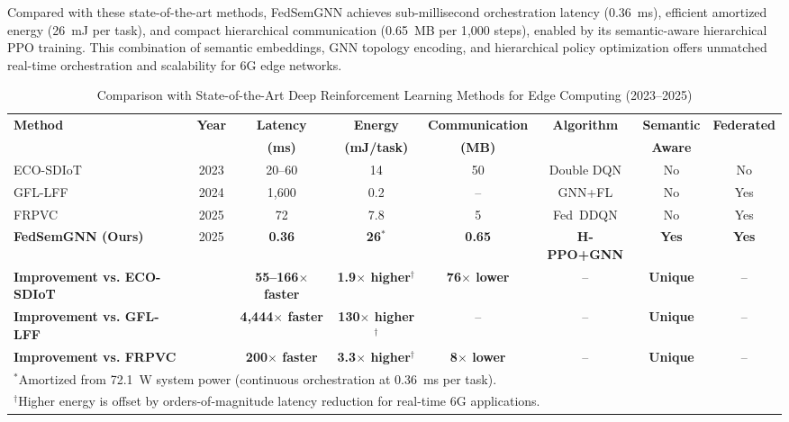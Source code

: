 \documentclass[conference]{IEEEtran}
\begin{document}
		Compared with these state-of-the-art methods, FedSemGNN achieves sub-millisecond orchestration latency (0.36~ms), efficient amortized energy (26~mJ per task), and compact hierarchical communication (0.65~MB per 1{,}000 steps), enabled by its semantic-aware hierarchical PPO training. 
		This combination of semantic embeddings, GNN topology encoding, and hierarchical policy optimization offers unmatched real-time orchestration and scalability for 6G edge networks.
		
		\begin{table}[htbp]
			\centering
			\caption{Comparison with State-of-the-Art Deep Reinforcement Learning Methods for Edge Computing (2023--2025)}
			\label{tab:sota_comparison}
			\small
			\begin{tabular}{lccccccc}
				\toprule
				\textbf{Method} & \textbf{Year} & \textbf{Latency} & \textbf{Energy} & \textbf{Communication} & \textbf{Algorithm} & \textbf{Semantic} & \textbf{Federated} \\
				& & \textbf{(ms)} & \textbf{(mJ/task)} & \textbf{(MB)} & & \textbf{Aware} & \\
				\midrule
				ECO-SDIoT~\cite{zhu2023eco} & 2023 & 20--60 & 14 & 50 & Double DQN & No & No \\
				GFL-LFF~\cite{regan2024gfl} & 2024 & 1{,}600 & 0.2 & -- & GNN+FL & No & Yes \\
				FRPVC~\cite{qian2025frpvc} & 2025 & 72 & 7.8 & 5 & Fed~DDQN & No & Yes \\
				\midrule
				\textbf{FedSemGNN (Ours)} & 2025 & \textbf{0.36} & \textbf{26}$^*$ & \textbf{0.65} & \textbf{H-PPO+GNN} & \textbf{Yes} & \textbf{Yes} \\
				\midrule
				\textbf{Improvement vs. ECO-SDIoT} & & \textbf{55--166$\times$ faster} & \textbf{1.9$\times$ higher}$^\dagger$ & \textbf{76$\times$ lower} & -- & \textbf{Unique} & -- \\
				\textbf{Improvement vs. GFL-LFF} & & \textbf{4{,}444$\times$ faster} & \textbf{130$\times$ higher}$^\dagger$ & -- & -- & \textbf{Unique} & -- \\
				\textbf{Improvement vs. FRPVC} & & \textbf{200$\times$ faster} & \textbf{3.3$\times$ higher}$^\dagger$ & \textbf{8$\times$ lower} & -- & \textbf{Unique} & -- \\
				\bottomrule
				\multicolumn{8}{l}{\footnotesize $^*$Amortized from 72.1~W system power (continuous orchestration at 0.36~ms per task).}\\
				\multicolumn{8}{l}{\footnotesize $^\dagger$Higher energy is offset by orders-of-magnitude latency reduction for real-time 6G applications.}\\
			\end{tabular}
		\end{table}
		
\end{document}

